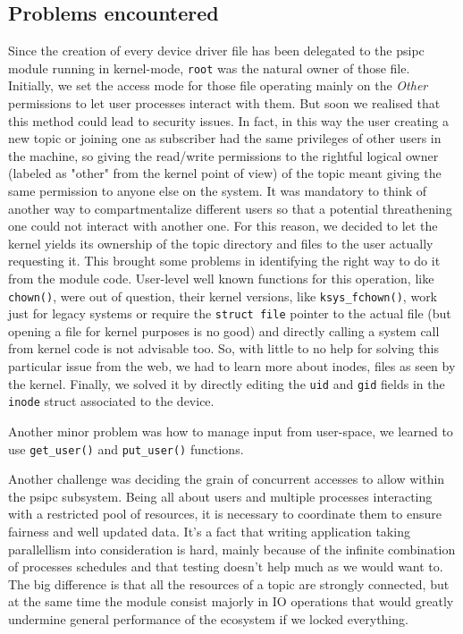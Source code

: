 \documentclass[10pt,a4]{article}
\newcommand{\code}[1]{\texttt{#1}}
\begin{document}
\subsection{Problems encountered}
Since the creation of every device driver file has been delegated to the psipc module running in kernel-mode, \code{root} was the natural owner of those file. Initially, we set the access mode for those file operating mainly on the \textit{Other} permissions to let user processes interact with them. But soon we realised that this method could lead to security issues. In fact, in this way the user creating a new topic or joining one as subscriber had the same privileges of other users in the machine, so giving the read/write permissions to the rightful logical owner (labeled as "other" from the kernel point of view) of the topic meant giving the same permission to anyone else on the system. It was mandatory to think of another way to compartmentalize different users so that a potential threathening one could not interact with another one. For this reason, we decided to let the kernel yields its ownership of the topic directory and files to the user actually requesting it. This brought some problems in identifying the right way to do it from the module code. User-level well known functions for this operation, like \code{chown()}, were out of question, their kernel versions, like \code{ksys\_fchown()}, work just for legacy systems or require the \code{struct file} pointer to the actual file (but opening a file for kernel purposes is no good) and directly calling a system call from kernel code is not advisable too. So, with little to no help for solving this particular issue from the web, we had to learn more about inodes, files as seen by the kernel. Finally, we solved it by directly editing the \code{uid} and \code{gid} fields in the \code{inode} struct associated to the device.

Another minor problem was how to manage input from user-space, we learned to use \code{get\_user()} and \code{put\_user()} functions.

Another challenge was deciding the grain of concurrent accesses to allow within the psipc subsystem. Being all about users and multiple processes interacting with a restricted pool of resources, it is necessary to coordinate them to ensure fairness and well updated data. It's a fact that writing application taking parallellism into consideration is hard, mainly because of the infinite combination of processes schedules and that testing doesn't help much as we would want to. The big difference is that all the resources of a topic are strongly connected, but at the same time the module consist majorly in IO operations that would greatly undermine general performance of the ecosystem if we locked everything. %
\end{document}
